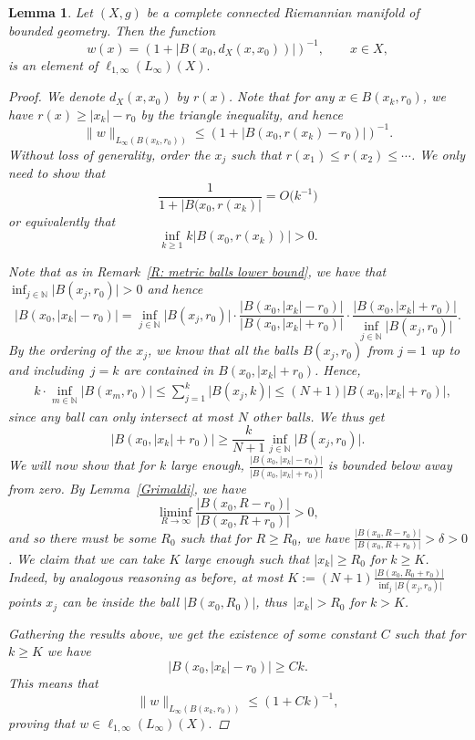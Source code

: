 \documentclass[pdftex]{sigma}
\numberwithin{equation}{section}
\newtheorem{Lemma}[Theorem]{Lemma}
\newcommand{\abs}[1]{\lvert#1\rvert}
\begin{document}
\begin{Lemma}\label{wl1infty}
Let $(X,g)$ be a complete connected Riemannian manifold of bounded geometry. Then the function
\[
 w(x) = (1+\abs{B(x_0,d_X(x,x_0))})^{-1},\qquad x \in X,
\]
is an element of $\ell_{1,\infty}(L_\infty)(X).$
\begin{proof}
We denote $d_X(x,x_0)$ by $r(x)$. Note that for any $x \in B(x_k, r_0)$, we have $r(x) \geq \abs{x_k}-r_0$ by the triangle inequality, and hence
\[
\|w\|_{L_\infty(B(x_k,r_0))} \leq (1+\abs{B(x_0,r(x_k)-r_0)})^{-1}.
\]
Without loss of generality, order the $x_j$ such that $r(x_1) \leq r(x_2) \leq \cdots$. We only need to show that
\[
 \frac{1}{1+|B(x_0,r(x_k)|} = O\big(k^{-1}\big)
\]
or equivalently that
\[
 \inf_{k\geq 1} k|B(x_0,r(x_k))| > 0.
\]

Note that as in Remark~\ref{R: metric balls lower bound}, we have that $\inf_{j \in \mathbb{N}} \abs{B(x_j, r_0)} > 0$ and hence
\[
 \abs{B(x_0,\abs{x_k}-r_0)} = \inf_{j \in \mathbb{N}} \abs{B(x_j, r_0)} \cdot \frac{ \abs{B(x_0, \abs{x_k}-r_0)}}{ \abs{B(x_0, \abs{x_k}+r_0)}} \cdot \frac{\abs{B(x_0, \abs{x_k}+r_0)}}{\inf_{j \in \mathbb{N}} \abs{B(x_j, r_0)}}.
\]
By the ordering of the $x_j$, we know that all the balls $B(x_j, r_0)$ from $j=1$ up to and including~${j=k}$ are contained in $B(x_0, \abs{x_k}+r_0)$.
Hence,
\begin{align*}
& k \cdot \inf_{m\in \mathbb{N}} \abs{B(x_m, r_0)} \leq \sum_{j=1}^k \abs{B(x_j, k)} \leq (N+1) \abs{B(x_0, \abs{x_k}+r_0)},
\end{align*}
since any ball can only intersect at most $N$ other balls. We thus get
\[
\abs{B(x_0, \abs{x_k}+r_0)} \geq \frac{k}{N+1}\inf_{j \in \mathbb{N}} \abs{B(x_j, r_0)}.
\]
We will now show that for $k$ large enough, $\frac{ \abs{B(x_0, \abs{x_k}-r_0)}}{ \abs{B(x_0, \abs{x_k}+r_0)}}$ is bounded below away from zero. By Lemma~\ref{Grimaldi}, we have
\[
\liminf_{R \to \infty} \frac{ \abs{B(x_0, R-r_0)}}{ \abs{B(x_0, R+r_0)}} > 0,
\]
and so there must be some $R_0$ such that for $R \geq R_0$, we have $\frac{ \abs{B(x_0, R-r_0)}}{ \abs{B(x_0, R+r_0)}} > \delta > 0$. We claim that we can take $K$ large enough such that $\abs{x_k} \geq R_0$ for $k \geq K$. Indeed, by analogous reasoning as before, at most $K:= (N+1)\frac{\abs{B(x_0, R_0+r_0)}}{\inf_j \abs{ B(x_j, r_0)}}$ points $x_j$ can be inside the ball $\abs{B(x_0, R_0)}$, thus~$\abs{x_k} > R_0$ for $k > K$.

Gathering the results above, we get the existence of some constant $C$ such that for $k \geq K$ we have
\[
\abs{B(x_0,\abs{x_k}-r_0)} \geq C k.
\]
This means that
\[
\|w\|_{L_\infty(B(x_k,r_0))} \leq (1+C k)^{-1},
\]
proving that $w \in \ell_{1,\infty}(L_\infty)(X).$
\end{proof}
\end{Lemma}
\end{document}
